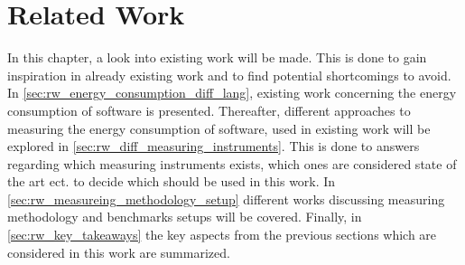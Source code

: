 \chapter{Related Work}\label{ch:related_work}

In this chapter, a look into existing work will be made. This is done to gain inspiration in already existing work and to find potential shortcomings to avoid. In \cref{sec:rw_energy_consumption_diff_lang}, existing work concerning the energy consumption of software is presented. Thereafter, different approaches to measuring the energy consumption of software, used in existing work will be explored in \cref{sec:rw_diff_measuring_instruments}. This is done to answers regarding which measuring instruments exists, which ones are considered state of the art ect. to decide which should be used in this work. In \cref{sec:rw_measureing_methodology_setup} different works discussing measuring methodology and benchmarks setups will be covered. Finally, in \cref{sec:rw_key_takeaways} the key aspects from the previous sections which are considered in this work are summarized.


% 


